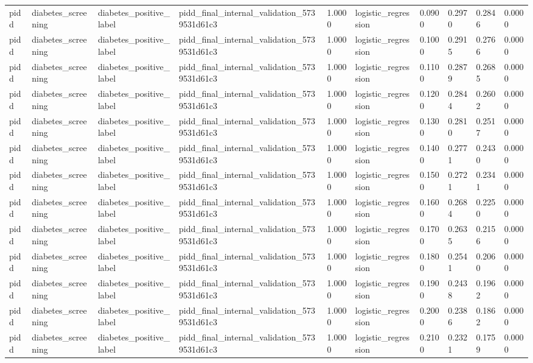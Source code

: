 \begin{tabular}{llllllllll}
pidd & diabetes\_screening & diabetes\_positive\_label & pidd\_final\_internal\_validation\_5739531d61c3 & 1.0000 & logistic\_regression & 0.0900 & 0.2970 & 0.2846 & 0.0000 \\
pidd & diabetes\_screening & diabetes\_positive\_label & pidd\_final\_internal\_validation\_5739531d61c3 & 1.0000 & logistic\_regression & 0.1000 & 0.2915 & 0.2766 & 0.0000 \\
pidd & diabetes\_screening & diabetes\_positive\_label & pidd\_final\_internal\_validation\_5739531d61c3 & 1.0000 & logistic\_regression & 0.1100 & 0.2879 & 0.2685 & 0.0000 \\
pidd & diabetes\_screening & diabetes\_positive\_label & pidd\_final\_internal\_validation\_5739531d61c3 & 1.0000 & logistic\_regression & 0.1200 & 0.2844 & 0.2602 & 0.0000 \\
pidd & diabetes\_screening & diabetes\_positive\_label & pidd\_final\_internal\_validation\_5739531d61c3 & 1.0000 & logistic\_regression & 0.1300 & 0.2810 & 0.2517 & 0.0000 \\
pidd & diabetes\_screening & diabetes\_positive\_label & pidd\_final\_internal\_validation\_5739531d61c3 & 1.0000 & logistic\_regression & 0.1400 & 0.2771 & 0.2430 & 0.0000 \\
pidd & diabetes\_screening & diabetes\_positive\_label & pidd\_final\_internal\_validation\_5739531d61c3 & 1.0000 & logistic\_regression & 0.1500 & 0.2721 & 0.2341 & 0.0000 \\
pidd & diabetes\_screening & diabetes\_positive\_label & pidd\_final\_internal\_validation\_5739531d61c3 & 1.0000 & logistic\_regression & 0.1600 & 0.2684 & 0.2250 & 0.0000 \\
pidd & diabetes\_screening & diabetes\_positive\_label & pidd\_final\_internal\_validation\_5739531d61c3 & 1.0000 & logistic\_regression & 0.1700 & 0.2635 & 0.2156 & 0.0000 \\
pidd & diabetes\_screening & diabetes\_positive\_label & pidd\_final\_internal\_validation\_5739531d61c3 & 1.0000 & logistic\_regression & 0.1800 & 0.2541 & 0.2060 & 0.0000 \\
pidd & diabetes\_screening & diabetes\_positive\_label & pidd\_final\_internal\_validation\_5739531d61c3 & 1.0000 & logistic\_regression & 0.1900 & 0.2438 & 0.1962 & 0.0000 \\
pidd & diabetes\_screening & diabetes\_positive\_label & pidd\_final\_internal\_validation\_5739531d61c3 & 1.0000 & logistic\_regression & 0.2000 & 0.2386 & 0.1862 & 0.0000 \\
pidd & diabetes\_screening & diabetes\_positive\_label & pidd\_final\_internal\_validation\_5739531d61c3 & 1.0000 & logistic\_regression & 0.2100 & 0.2321 & 0.1759 & 0.0000 \\

\end{tabular}
